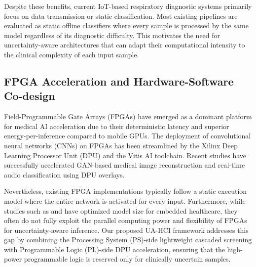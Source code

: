 Despite these benefits, current IoT-based respiratory diagnostic systems primarily focus on data transmission or static classification. Most existing pipelines are evaluated as static offline classifiers where every sample is processed by the same model regardless of its diagnostic difficulty. This motivates the need for uncertainty-aware architectures that can adapt their computational intensity to the clinical complexity of each input sample.

\subsection{FPGA Acceleration and Hardware-Software Co-design}
Field-Programmable Gate Arrays (FPGAs) have emerged as a dominant platform for medical AI acceleration due to their deterministic latency and superior energy-per-inference compared to mobile GPUs. The deployment of convolutional neural networks (CNNs) on FPGAs has been streamlined by the Xilinx Deep Learning Processor Unit (DPU) and the Vitis AI toolchain. Recent studies have successfully accelerated GAN-based medical image reconstruction \cite{zhu2023} and real-time audio classification \cite{fazilat2023} using DPU overlays. 

Nevertheless, existing FPGA implementations typically follow a static execution model where the entire network is activated for every input. Furthermore, while studies such as \cite{b13} and \cite{b14} have optimized model size for embedded healthcare, they often do not fully exploit the parallel computing power and flexibility of FPGAs for uncertainty-aware inference. Our proposed UA-HCI framework addresses this gap by combining the Processing System (PS)-side lightweight cascaded screening with Programmable Logic (PL)-side DPU acceleration, ensuring that the high-power programmable logic is reserved only for clinically uncertain samples.

